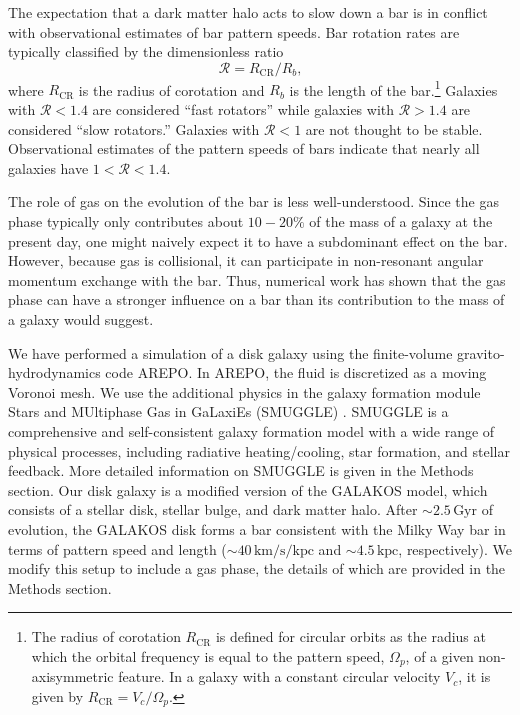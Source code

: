 \documentclass{natureprintstyle}
\newcommand{\RCR}{\ensuremath{R_{\textrm{CR}}}}
\newcommand{\Rot}{\ensuremath{\mathcal{R}}}
\begin{document}
The expectation that a dark matter halo acts to slow down a bar is in
conflict with observational estimates of bar pattern speeds. Bar rotation
rates are typically classified by the dimensionless ratio
\begin{equation}
\Rot = \RCR/R_b\textrm{,}
\end{equation}
where \RCR{} is the radius of corotation and $R_b$ is the length of the
bar.\footnote{The radius of corotation \RCR{} is defined for circular orbits
as the radius at which the orbital frequency is equal to the pattern speed,
$\Omega_p$, of a given non-axisymmetric feature. In a galaxy with a constant
circular velocity $V_c$, it is given by $\RCR = V_c / \Omega_p$.} Galaxies
with $\Rot < 1.4$ are considered ``fast rotators'' while galaxies with $\Rot >
1.4$ are considered ``slow rotators.''\cite{2000ApJ...543..704D} Galaxies with
$\Rot < 1$ are not thought to be stable.\cite{1980AA....81..198C}
Observational estimates of the pattern speeds of bars indicate that nearly all
galaxies have $1 < \Rot < 1.4$.\cite{2011MSAIS..18...23C, 2015AA...576A.102A,
2019MNRAS.482.1733G}

The role of gas on the evolution of the bar is less well-understood. Since the
gas phase typically only contributes about $10-20\%$ of the mass of a galaxy
at the present day, one might naively expect it to have a subdominant effect
on the bar. However, because gas is collisional, it can participate in
non-resonant angular momentum exchange with the bar.\cite{2011MNRAS.415.1027H}
Thus, numerical work has shown that the gas phase can have a stronger
influence on a bar than its contribution to the mass of a galaxy would
suggest.\cite{2010ApJ...719.1470V, 2013MNRAS.429.1949A}

We have performed a simulation of a disk galaxy using the finite-volume
gravito-hydrodynamics code AREPO.\cite{2010MNRAS.401..791S} In AREPO, the
fluid is discretized as a moving Voronoi mesh. We use the additional physics
in the galaxy formation module Stars and MUltiphase Gas in GaLaxiEs (SMUGGLE)
\cite{2019MNRAS.489.4233M}. SMUGGLE is a comprehensive and self-consistent
galaxy formation model with a wide range of physical processes, including
radiative heating/cooling, star formation, and stellar feedback. More detailed
information on SMUGGLE is given in the Methods section. Our disk galaxy is a
modified version of the GALAKOS model\cite{2020ApJ...890..117D}, which
consists of a stellar disk, stellar bulge, and dark matter halo. After
$\sim2.5\,\textrm{Gyr}$ of evolution, the GALAKOS disk forms a bar consistent
with the Milky Way bar in terms of pattern speed and length
($\sim40\,\textrm{km}/\textrm{s}/\textrm{kpc}$ and $\sim4.5\,\textrm{kpc}$,
respectively). We modify this setup to include a gas phase, the details of
which are provided in the Methods section.
\end{document}

